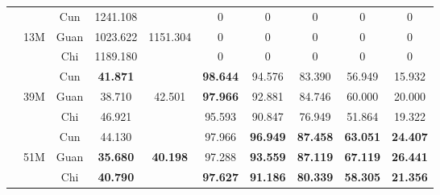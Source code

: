 \documentclass[twocolumn]{article}
\begin{document}
\begin{table}[t]
{\begin{tabular}{|c|c|c|c|c|c|c|c|c|c|}
        \hline
        & &Cun &1241.108 & &0 &0 &0 &0 &0\\
        &13M &Guan &1023.622 &1151.304 &0 &0 &0 &0 &0\\
        & &Chi &1189.180 & &0 &0 &0 &0 &0\\
        \hline
        & &Cun &\textbf{41.871} & &\textbf{98.644} &94.576 &83.390 &56.949 &15.932\\
        &39M &Guan &38.710 &42.501 &\textbf{97.966} &92.881 &84.746 &60.000 &20.000\\
        & &Chi &46.921 & &95.593 &90.847 &76.949 &51.864 &19.322\\
        \hline
        & &Cun &44.130 & &97.966 &\textbf{96.949} &\textbf{87.458} &\textbf{63.051} &\textbf{24.407}\\
        &51M &Guan &\textbf{35.680} &\textbf{40.198} &97.288 &\textbf{93.559} &\textbf{87.119} &\textbf{67.119} &\textbf{26.441}\\
        & &Chi &\textbf{40.790} & &\textbf{97.627} &\textbf{91.186} &\textbf{80.339} &\textbf{58.305} &\textbf{21.356}\\
        \hline
    \end{tabular}}
    \label{tab:comparison-with-other-models}
\end{table}
\end{document}
